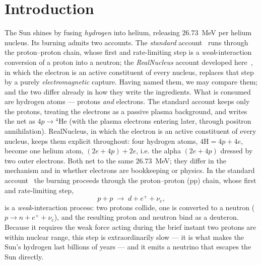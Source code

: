 \documentclass[11pt]{article}
\begin{document}
\doublespacing

\section{Introduction}

The Sun shines by fusing \emph{hydrogen} into helium, releasing $26.73$~MeV per helium nucleus. Its
burning admits two accounts. The \emph{standard} account~\cite{Bethe,Adelberger} runs through the
proton--proton chain, whose first and rate-limiting step is a \emph{weak}-interaction conversion of a
proton into a neutron; the \emph{RealNucleus} account developed here~\cite{Johnson-RealNucleus,%
Johnson-RealQM}, in which the electron is an active constituent of every nucleus, replaces that step by
a purely \emph{electromagnetic} capture. Having named them, we may compare them; and the two differ
already in how they write the ingredients. What is consumed are hydrogen atoms --- protons \emph{and}
electrons. The standard account keeps only the protons, treating
the electrons as a passive plasma background, and writes the net as $4p\to{}^4\mathrm{He}$ (with the
plasma electrons entering later, through positron annihilation). RealNucleus, in which the electron is
an active constituent of every nucleus, keeps them explicit throughout: four hydrogen atoms,
$4\mathrm{H}=4p+4e$, become one helium atom, $(2e+4p)+2e$, i.e. the alpha $(2e+4p)$ dressed by two outer
electrons. Both net to the same $26.73$~MeV; they differ in the mechanism and in whether electrons are
bookkeeping or physics. In the standard account~\cite{Bethe,Adelberger} the burning proceeds through the
proton--proton (pp) chain, whose first and rate-limiting step,
\begin{equation}
p + p \;\longrightarrow\; d + e^{+} + \nu_e ,
\label{eq:pp}
\end{equation}
is a \emph{weak}-interaction process: two protons collide, one is converted to a neutron
($p\to n + e^{+} + \nu_e$), and the resulting proton and neutron bind as a deuteron. Because it
requires the weak force acting during the brief instant two protons are within nuclear range, this
step is extraordinarily slow --- it is what makes the Sun's hydrogen last billions of years --- and it
emits a neutrino that escapes the Sun directly.
\end{document}

